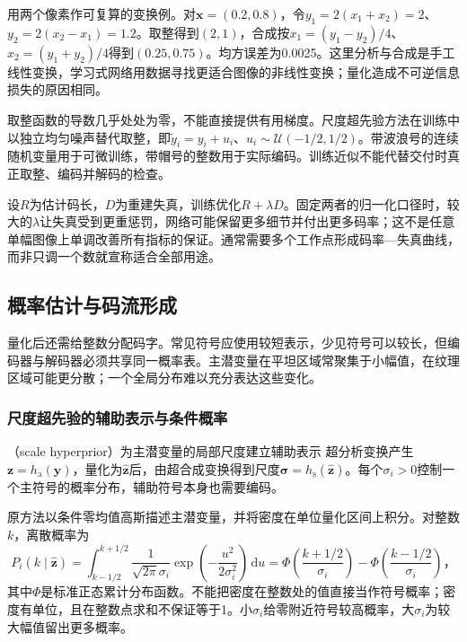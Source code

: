 用两个像素作可复算的变换例。对$\bm{x}=(0.2,0.8)$，令$y_1=2(x_1+x_2)=2$、$y_2=2(x_2-x_1)=1.2$。取整得到$(2,1)$，合成按$x_1=(y_1-y_2)/4$、$x_2=(y_1+y_2)/4$得到$(0.25,0.75)$。均方误差为0.0025。这里分析与合成是手工线性变换，学习式网络用数据寻找更适合图像的非线性变换；量化造成不可逆信息损失的原因相同。

取整函数的导数几乎处处为零，不能直接提供有用梯度。尺度超先验方法在训练中以独立均匀噪声替代取整，即$\tilde y_i=y_i+u_i$、$u_i\sim\mathcal{U}(-1/2,1/2)$。带波浪号的连续随机变量用于可微训练，带帽号的整数用于实际编码。训练近似不能代替交付时真正取整、编码并解码的检查。

设$R$为估计码长，$D$为重建失真，训练优化$R+\lambda D$。固定两者的归一化口径时，较大的$\lambda$让失真受到更重惩罚，网络可能保留更多细节并付出更多码率；这不是任意单幅图像上单调改善所有指标的保证。通常需要多个工作点形成码率—失真曲线，而非只调一个数就宣称适合全部用途。

\subsection{概率估计与码流形成}
\label{sec:vision-restoration-bitstream}

量化后还需给整数分配码字。常见符号应使用较短表示，少见符号可以较长，但编码器与解码器必须共享同一概率表。主潜变量在平坦区域常聚集于小幅值，在纹理区域可能更分散；一个全局分布难以充分表达这些变化。

\Needspace{45mm}
\subsubsection{尺度超先验的辅助表示与条件概率}
\label{sec:vision-restoration-hyperprior}

（scale hyperprior）为主潜变量的局部尺度建立辅助表示
超分析变换产生$\bm{z}=h_{\mathrm{a}}(\bm{y})$，量化为$\hat{\bm{z}}$后，由超合成变换得到尺度$\bm{\sigma}=h_{\mathrm{s}}(\hat{\bm{z}})$。每个$\sigma_i>0$控制一个主符号的概率分布，辅助符号本身也需要编码。

原方法以条件零均值高斯描述主潜变量，并将密度在单位量化区间上积分。对整数$k$，离散概率为
\begin{equation}
 P_i(k\mid\hat{\bm{z}})
 =\int_{k-1/2}^{k+1/2}
   \frac{1}{\sqrt{2\pi}\sigma_i}
   \exp\!\left(-\frac{u^2}{2\sigma_i^2}\right)\,\mathrm{d}u
 =\Phi\!\left(\frac{k+1/2}{\sigma_i}\right)
  -\Phi\!\left(\frac{k-1/2}{\sigma_i}\right)\text{，}
 \label{eq:vision-hyperprior-probability}
\end{equation}
其中$\Phi$是标准正态累计分布函数。不能把密度在整数处的值直接当作符号概率；密度有单位，且在整数点求和不保证等于1。小$\sigma_i$给零附近符号较高概率，大$\sigma_i$为较大幅值留出更多概率。

